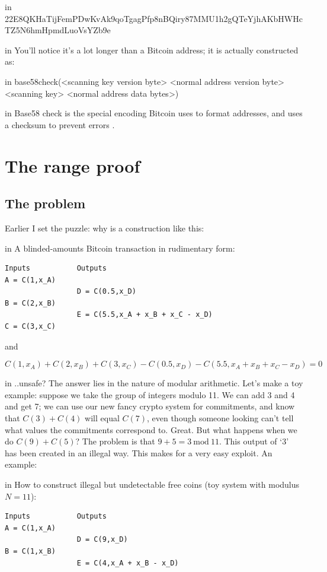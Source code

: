 \documentclass[10pt,a4paper]{article}
\begin{document}
 in \noindent 22E8QKHaTijFemPDwKvAk9qoTgagPfp8nBQiry87MMU1h2gQTeYjhAKbHWHcTZ5N6hmHpmdLuoVsYZb9e

 in \noindent You'll notice it's a lot longer than a Bitcoin address; it is actually constructed as:

 in \noindent base58check(<scanning key version byte> <normal address version byte> <scanning key> <normal address data bytes>)

 in \noindent Base58 check is the special encoding Bitcoin uses to format addresses, and uses a checksum to prevent errors \cite{b58check}.

\section{The range proof}

\subsection{The problem}

Earlier I set the puzzle: why is a construction like this:

 in \noindent A blinded-amounts Bitcoin transaction in rudimentary form:
\begin{verbatim}
Inputs           Outputs
A = C(1,x_A)
                 D = C(0.5,x_D)
B = C(2,x_B)
                 E = C(5.5,x_A + x_B + x_C - x_D)
C = C(3,x_C)
\end{verbatim}
and

\[C(1,x_A) + C(2,x_B) + C(3,x_C) - C(0.5,x_D) - C(5.5,x_A + x_B + x_C - x_D) = 0\]

 in \noindent ..unsafe? The answer lies in the nature of modular arithmetic. Let's make a toy example: suppose we take the group of integers modulo 11. We can add 3 and 4 and get 7; we can use our new fancy crypto system for commitments, and know that $C(3) + C(4)$ will equal $C(7)$, even though someone looking can't tell what values the commitments correspond to. Great. But what happens when we do $C(9) + C(5)$? The problem is that $9 + 5 = 3 \ \textrm{mod}\ 11$. This output of `3' has been created in an illegal way. This makes for a very easy exploit. An example:

 in \noindent How to construct illegal but undetectable free coins (toy system with modulus $N=11$):
\begin{verbatim}
Inputs           Outputs
A = C(1,x_A)
                 D = C(9,x_D)
B = C(1,x_B)
                 E = C(4,x_A + x_B - x_D)
\end{verbatim}
\end{document}
